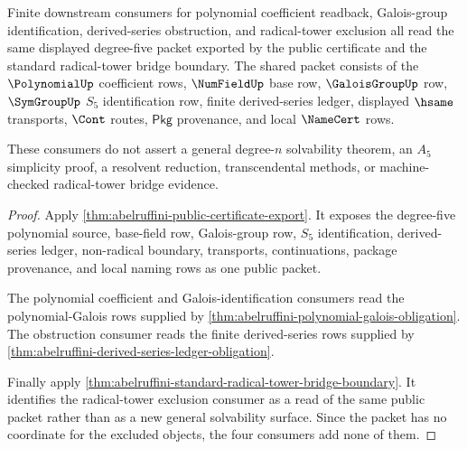 \begin{theorem}
\label{thm:abelruffini-degree-five-consumer-examples}
Finite downstream consumers for polynomial coefficient readback,
Galois-group identification, derived-series obstruction, and radical-tower
exclusion all read the same displayed degree-five packet exported by the
public certificate and the standard radical-tower bridge boundary. The shared
packet consists of the $\PolynomialUp$ coefficient rows, $\NumFieldUp$ base
row, $\GaloisGroupUp$ row, $\SymGroupUp$ $S_5$ identification row, finite
derived-series ledger, displayed $\hsame$ transports, $\Cont$ routes,
$\mathsf{Pkg}$ provenance, and local $\NameCert$ rows.

These consumers do not assert a general degree-$n$ solvability theorem, an
$A_5$ simplicity proof, a resolvent reduction, transcendental methods, or
machine-checked radical-tower bridge evidence.
\end{theorem}
\begin{proof}
Apply \autoref{thm:abelruffini-public-certificate-export}. It exposes the
degree-five polynomial source, base-field row, Galois-group row, $S_5$
identification, derived-series ledger, non-radical boundary, transports,
continuations, package provenance, and local naming rows as one public packet.

The polynomial coefficient and Galois-identification consumers read the
polynomial-Galois rows supplied by
\autoref{thm:abelruffini-polynomial-galois-obligation}. The obstruction
consumer reads the finite derived-series rows supplied by
\autoref{thm:abelruffini-derived-series-ledger-obligation}.

Finally apply
\autoref{thm:abelruffini-standard-radical-tower-bridge-boundary}. It identifies
the radical-tower exclusion consumer as a read of the same public packet rather
than as a new general solvability surface. Since the packet has no coordinate
for the excluded objects, the four consumers add none of them.
\end{proof}

